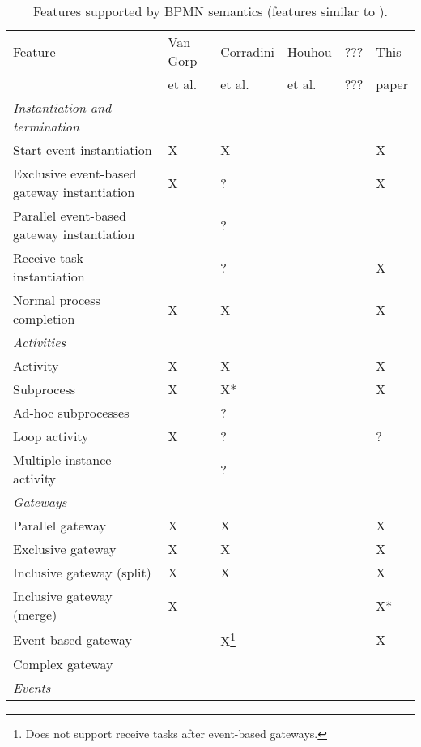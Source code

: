 \documentclass[adraft, copyright, creativecommons]{eptcs} %
\begin{document}
\begin{table}[h]

    \caption{Features supported by BPMN semantics (features similar to \cite{vangorpVisualTokenbasedFormalization2013}).}
    \label{tab:supportedFeatures}
    \begin{tabular}{l l l l l l} %
    \hline
      Feature & Van Gorp &  Corradini & Houhou & ??? & This\\
      & et al. \cite{vangorpVisualTokenbasedFormalization2013} & et al. \cite{corradiniFormalApproachAnalysis2021}& et al. \cite{houhouFirstOrderLogicSemantics2019} & ??? & paper\\
      \hline
      \textit{Instantiation and termination} & & &\\
      Start event instantiation & X & X & & & X\\
      Exclusive event-based gateway instantiation & X & ? & & & X\\
      Parallel event-based gateway instantiation &  & ? & & & \\
      Receive task instantiation &  & ? & & & X\\
      Normal process completion & X & X & & & X\\
      \textit{Activities} & & & & &\\
      Activity & X & X & & & X\\
      Subprocess & X & X* & & & X\\
      Ad-hoc subprocesses &  & ? & & &\\
      Loop activity & X & ? & & & ?\\
      Multiple instance activity &  & ? & & & \\
      \textit{Gateways} & & & & &\\
      Parallel gateway & X & X & & & X\\
      Exclusive gateway & X & X & & & X\\
      Inclusive gateway (split) & X & X & & & X\\
      Inclusive gateway (merge) & X & & & & X*\\
      Event-based gateway &  & X\footnote{Does not support receive tasks after event-based gateways.} & & & X\\ %
      Complex gateway & & & & &\\
      \textit{Events} &  &  &  &  & \\

\end{tabular}
\end{table}
\end{document}
